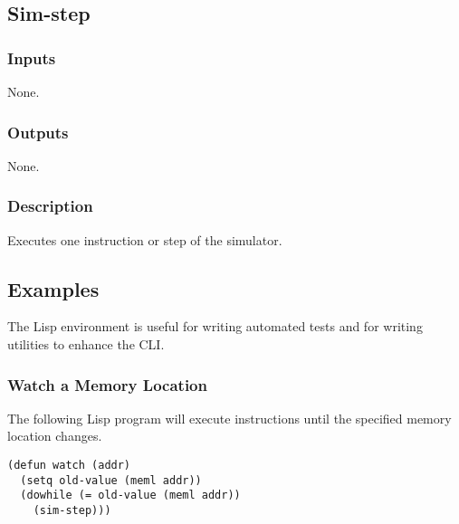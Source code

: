 \documentclass[10pt, openany]{book}
\begin{document}
\subsection{Sim-step}
\subsubsection{Inputs}
None.
\subsubsection{Outputs}
None.
\subsubsection{Description}
Executes one instruction or step of the simulator.

\subsection{Examples}
The Lisp environment is useful for writing automated tests and for writing utilities to enhance the CLI.
\subsubsection{Watch a Memory Location}
The following Lisp program will execute instructions until the specified memory location changes.
\lstset{language=[Tiny]Lisp}
\begin{lstlisting}
(defun watch (addr)
  (setq old-value (meml addr))
  (dowhile (= old-value (meml addr))
    (sim-step)))
\end{lstlisting}

\clearpage
{}
\nocite{m68000a}
\nocite{m68000b}
\nocite{i8080}


\end{document}
